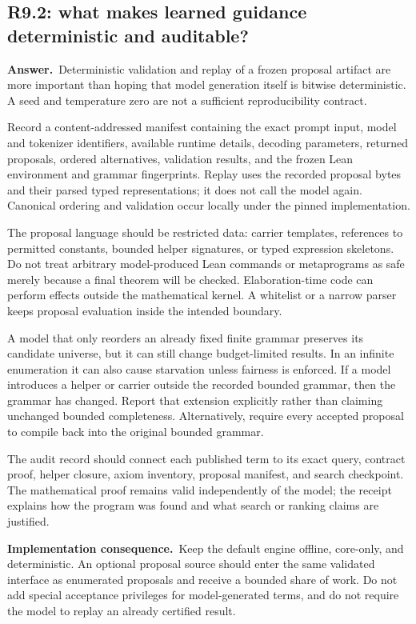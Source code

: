 \documentclass[11pt,a4paper]{article}
\theoremstyle{definition}
\theoremstyle{remark}
\newcommand{\ans}{\noindent\textbf{Answer.}\ }
\newcommand{\imp}{\par\noindent\textbf{Implementation consequence.}\ }
\begin{document}
\subsection{R9.2: what makes learned guidance deterministic and auditable?}\label{q:R9.2}
\ans Deterministic validation and replay of a frozen proposal artifact are more
important than hoping that model generation itself is bitwise deterministic.
A seed and temperature zero are not a sufficient reproducibility contract.

Record a content-addressed manifest containing the exact prompt input, model
and tokenizer identifiers, available runtime details, decoding parameters,
returned proposals, ordered alternatives, validation results, and the frozen
Lean environment and grammar fingerprints. Replay uses the recorded proposal
bytes and their parsed typed representations; it does not call the model
again. Canonical ordering and validation occur locally under the pinned
implementation.

The proposal language should be restricted data: carrier templates, references
to permitted constants, bounded helper signatures, or typed expression
skeletons. Do not treat arbitrary model-produced Lean commands or metaprograms
as safe merely because a final theorem will be checked. Elaboration-time code
can perform effects outside the mathematical kernel. A whitelist or a narrow
parser keeps proposal evaluation inside the intended boundary.

A model that only reorders an already fixed finite grammar preserves its
candidate universe, but it can still change budget-limited results. In an
infinite enumeration it can also cause starvation unless fairness is enforced.
If a model introduces a helper or carrier outside the recorded bounded
grammar, then the grammar has changed. Report that extension explicitly rather
than claiming unchanged bounded completeness. Alternatively, require every
accepted proposal to compile back into the original bounded grammar.

The audit record should connect each published term to its exact query,
contract proof, helper closure, axiom inventory, proposal manifest, and search
checkpoint. The mathematical proof remains valid independently of the model;
the receipt explains how the program was found and what search or ranking
claims are justified.

\imp Keep the default engine offline, core-only, and deterministic. An optional
proposal source should enter the same validated interface as enumerated
proposals and receive a bounded share of work. Do not add special acceptance
privileges for model-generated terms, and do not require the model to replay
an already certified result.
\end{document}
